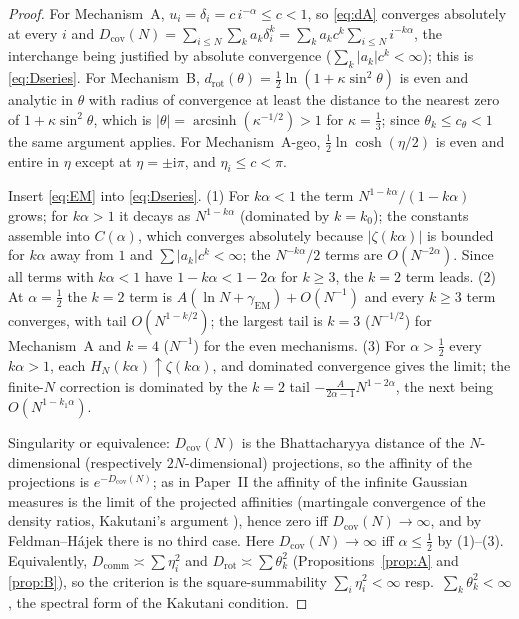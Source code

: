 \documentclass[11pt,reqno]{amsart}
\theoremstyle{plain}
\theoremstyle{definition}
\theoremstyle{remark}
\numberwithin{equation}{section}
\newcommand{\Dcov}{D_{\mathrm{cov}}}
\newcommand{\Dcomm}{D_{\mathrm{comm}}}
\newcommand{\Drot}{D_{\mathrm{rot}}}
\newcommand{\gEM}{\gamma_{\mathrm{EM}}}
\begin{document}
\begin{proof}
For Mechanism~A, $u_i=\delta_i=c\,i^{-\alpha}\le c<1$, so \eqref{eq:dA} converges absolutely at every $i$ and $\Dcov(N)=\sum_{i\le N}\sum_ka_k\delta_i^k=\sum_ka_kc^k\sum_{i\le N}i^{-k\alpha}$, the interchange being justified by absolute convergence ($\sum_k|a_k|c^k<\infty$); this is \eqref{eq:Dseries}. For Mechanism~B, $d_{\mathrm{rot}}(\theta)=\frac12\ln(1+\kappa\sin^2\theta)$ is even and analytic in $\theta$ with radius of convergence at least the distance to the nearest zero of $1+\kappa\sin^2\theta$, which is $|\theta|=\operatorname{arcsinh}(\kappa^{-1/2})>1$ for $\kappa=\tfrac13$; since $\theta_k\le c_\theta<1$ the same argument applies. For Mechanism~A-geo, $\frac12\ln\cosh(\eta/2)$ is even and entire in $\eta$ except at $\eta=\pm\mathrm i\pi$, and $\eta_i\le c<\pi$.

Insert \eqref{eq:EM} into \eqref{eq:Dseries}. (1) For $k\alpha<1$ the term $N^{1-k\alpha}/(1-k\alpha)$ grows; for $k\alpha>1$ it decays as $N^{1-k\alpha}$ (dominated by $k=k_0$); the constants assemble into $C(\alpha)$, which converges absolutely because $|\zeta(k\alpha)|$ is bounded for $k\alpha$ away from $1$ and $\sum|a_k|c^k<\infty$; the $N^{-k\alpha}/2$ terms are $O(N^{-2\alpha})$. Since all terms with $k\alpha<1$ have $1-k\alpha<1-2\alpha$ for $k\ge3$, the $k=2$ term leads. (2) At $\alpha=\tfrac12$ the $k=2$ term is $A(\ln N+\gEM)+O(N^{-1})$ and every $k\ge3$ term converges, with tail $O(N^{1-k/2})$; the largest tail is $k=3$ ($N^{-1/2}$) for Mechanism~A and $k=4$ ($N^{-1}$) for the even mechanisms. (3) For $\alpha>\tfrac12$ every $k\alpha>1$, each $H_N(k\alpha)\uparrow\zeta(k\alpha)$, and dominated convergence gives the limit; the finite-$N$ correction is dominated by the $k=2$ tail $-\frac{A}{2\alpha-1}N^{1-2\alpha}$, the next being $O(N^{1-k_1\alpha})$.

Singularity or equivalence: $\Dcov(N)$ is the Bhattacharyya distance of the $N$-dimensional (respectively $2N$-dimensional) projections, so the affinity of the projections is $e^{-\Dcov(N)}$; as in Paper~II the affinity of the infinite Gaussian measures is the limit of the projected affinities (martingale convergence of the density ratios, Kakutani's argument \cite{Kakutani1948}), hence zero iff $\Dcov(N)\to\infty$, and by Feldman--H\'ajek \cite{Feldman1958,Hajek1958} there is no third case. Here $\Dcov(N)\to\infty$ iff $\alpha\le\tfrac12$ by (1)--(3). Equivalently, $\Dcomm\asymp\sum\eta_i^2$ and $\Drot\asymp\sum\theta_k^2$ (Propositions~\ref{prop:A} and \ref{prop:B}), so the criterion is the square-summability $\sum_i\eta_i^2<\infty$ resp.\ $\sum_k\theta_k^2<\infty$, the spectral form of the Kakutani condition.
\end{proof}
\end{document}
